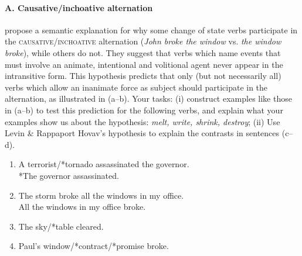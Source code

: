 \paragraph*{A. Causative/inchoative alternation\footnotemark{}}
\citet[102--105]{LevinRappaportHovav1995} propose a semantic explanation for why some change of state verbs participate in the \textsc{causative/inchoative} alternation (\textit{John broke the window} vs. \textit{the window broke}), while others do not. They suggest that verbs which name events that must involve an animate, intentional and volitional agent never appear in the intransitive form. This hypothesis predicts that only (but not necessarily all) verbs which allow an inanimate force as subject should participate in the alternation, as illustrated in (a--b). Your tasks:
(i) construct examples like those in (a--b) to test this prediction for the following verbs, and explain what your examples show us about the hypothesis: \textit{melt, write, shrink, destroy}; (ii) Use Levin \& Rappaport Hovav’s hypothesis to explain the contrasts in sentences (c--d).

\begin{enumerate}[label=\alph*.]
\item A terrorist/*tornado assassinated the governor.\\
*The governor assassinated.
\item The storm broke all the windows in my office.\\
All the windows in my office broke.
\item The sky/*table cleared.
\item Paul’s window/*contract/*promise broke.
\end{enumerate}
